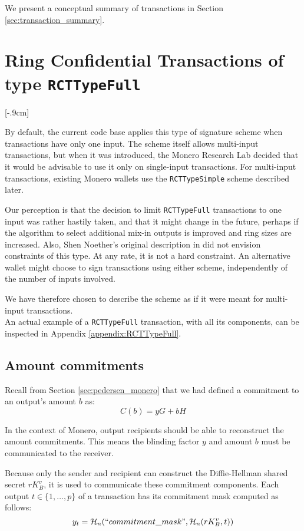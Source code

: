 We present a conceptual summary of transactions in Section \ref{sec:transaction_summary}.

\newpage
\section{Ring Confidential Transactions of type {\tt RCTTypeFull}}[-.9cm]
\label{sec:RCTTypeFull}

By default, the current code base applies this type of signature scheme when transactions have only one input. The scheme itself allows multi-input transactions, but when it was introduced, the Monero Research Lab decided that it would be advisable to use it only on single-input transactions. For multi-input transactions, existing Monero wallets use the {\tt RCTTypeSimple} scheme described later.

Our perception is that the decision to limit {\tt RCTTypeFull} transactions to one input was rather hastily taken, and that it might change in the future, perhaps if the algorithm to select additional mix-in outputs is improved and ring sizes are increased. Also, Shen Noether’s original description in \cite{MRL-0005} did not envision constraints of this type. At any rate, it is not a hard constraint. An alternative wallet might choose to sign transactions using either scheme, independently of the number of inputs involved.

We have therefore chosen to describe the scheme as if it were meant for multi-input transactions.
\\

An actual example of a {\tt RCTTypeFull} transaction, with all its components, can be inspected in Appendix \ref{appendix:RCTTypeFull}.


\subsection{Amount commitments}
\label{amount-commitments}
Recall from Section \ref{sec:pedersen_monero} that we had defined a commitment to an output’s amount $b$ as: \vspace{.2cm}
\[C(b) = y G + b H\]

In the context of Monero, output recipients should be able to reconstruct the amount commitments. This means the blinding factor $y$ and amount $b$ must be communicated to the receiver.

Because only the sender and recipient can construct the Diffie-Hellman shared secret $r K_B^v$, it is used to communicate these commitment components. Each output $t \in \{1,\ldots,p\}$ of a transaction has its commitment mask computed as follows:\\
\[y_t = \mathcal{H}_n(``commitment\_mask",\mathcal{H}_n(r K_B^v, t))\]

